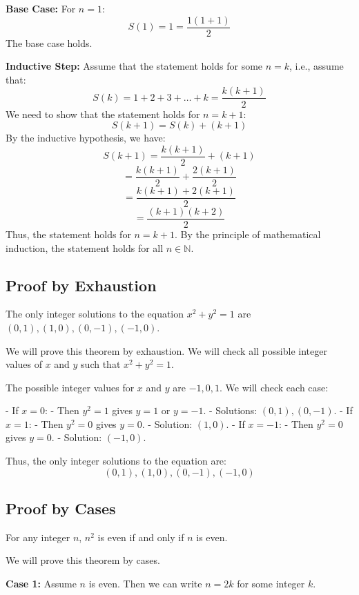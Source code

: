 	\textbf{Base Case:} For \( n = 1 \):
	\[
		S(1) = 1 = \frac{1(1+1)}{2}
	\]
	The base case holds.

	\textbf{Inductive Step:} Assume that the statement holds for some \( n = k \), i.e., assume that:
	\[
		S(k) = 1 + 2 + 3 + \ldots + k = \frac{k(k+1)}{2}
	\]
	We need to show that the statement holds for \( n = k + 1 \):
	\[
		S(k+1) = S(k) + (k + 1)
	\]
	By the inductive hypothesis, we have:
	\[
		S(k+1) = \frac{k(k+1)}{2} + (k + 1)
	\]
	\[
		= \frac{k(k+1)}{2} + \frac{2(k + 1)}{2}
	\]
	\[      = \frac{k(k+1) + 2(k + 1)}{2}
	\]
	\[
		= \frac{(k + 1)(k + 2)}{2}
	\]
	Thus, the statement holds for \( n = k + 1 \).
	By the principle of mathematical induction, the statement holds for all \( n \in \mathbb{N} \).

\QED

\subsection{Proof by Exhaustion}

The only integer solutions to the equation \( x^2 + y^2 = 1 \) are \( (0, 1), (1, 0), (0, -1), (-1, 0) \).


	We will prove this theorem by exhaustion. We will check all possible integer values of \( x \) and \( y \) such that \( x^2 + y^2 = 1 \).

	The possible integer values for \( x \) and \( y \) are \( -1, 0, 1 \). We will check each case:

	- If \( x = 0 \):
	- Then \( y^2 = 1 \) gives \( y = 1 \) or \( y = -1 \).
	- Solutions: \( (0, 1), (0, -1) \).
	- If \( x = 1 \):
	- Then \( y^2 = 0 \) gives \( y = 0 \).
	- Solution: \( (1, 0) \).
	- If \( x = -1 \):
	- Then \( y^2 = 0 \) gives \( y = 0 \).
	- Solution: \( (-1, 0) \).

	Thus, the only integer solutions to the equation are:
	\[
		(0, 1), (1, 0), (0, -1), (-1, 0)
	\]

\QED

\subsection{Proof by Cases}

For any integer \( n \), \( n^2 \) is even if and only if \( n \) is even.


	We will prove this theorem by cases.

	\textbf{Case 1:} Assume \( n \) is even. Then we can write \( n = 2k \) for some integer \( k \).

